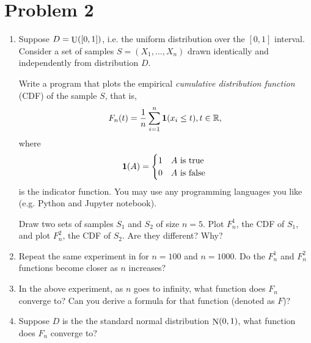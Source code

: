 \documentclass{article}
\DeclareMathOperator*{\U}{{\rm U}}
\DeclareMathOperator*{\N}{{\rm N}}
\newcommand{\RR}{\mathbb{R}} %
\newcommand*{\one}{{\bf 1}}
\begin{document}
\section*{Problem 2}
\begin{enumerate}
\item Suppose $D = \U([0,1])$, i.e. the uniform distribution over the
$[0,1]$ interval.
Consider a set of samples $S = (X_1, \ldots, X_n)$
drawn identically and independently from distribution $D$.

Write a program that plots the empirical {\em cumulative distribution
function} (CDF) of the sample $S$, that is,
\[ F_n(t) = \frac{1}{n} \sum_{i=1}^n \one(x_i \leq t), t \in \RR, \]
where
\[ \one(A) = \begin{cases} 1 & A \text{ is true } \\ 0 & A \text{ is false } \end{cases} \]
is the indicator function. You may use any programming languages you like (e.g. Python and Jupyter
notebook).

Draw two sets of samples $S_1$ and $S_2$ of size $n = 5$. Plot $F_n^1$,
the CDF of $S_1$, and plot $F_n^2$, the CDF of $S_2$. Are they different? Why?

\label{item:2-a}

\item Repeat the same experiment in \label{item:2-a} for $n = 100$ and $n=1000$. Do
the $F_n^1$ and $F_n^2$ functions become closer as $n$ increases?
\label{item:2-b}

\item In the above experiment, as $n$ goes to infinity, what function does $F_n$ converge to?
Can you derive a formula for that function (denoted as $F$)?
\label{item:2-c}

\item Suppose $D$ is the the
standard normal distribution $\N(0,1)$, what function does $F_n$ converge to?
\end{enumerate}
\end{document}
